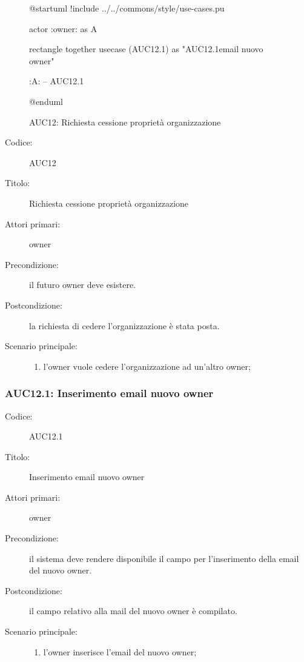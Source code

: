 \documentclass[../../../analisi-dei-requisiti.tex]{subfiles}
\begin{document}
\begin{figure}[H]
  \centering
  \begin{plantuml}
  @startuml
  !include ../../commons/style/use-cases.pu

  actor :owner: as A

  rectangle {
    together {
      usecase (AUC12.1) as "AUC12.1\nInserimento email nuovo owner"
    }
  }

  :A: -- AUC12.1

  @enduml
  \end{plantuml}
  \caption{AUC12: Richiesta cessione proprietà organizzazione}
  \label{fig:auc12}
\end{figure}

\begin{description}
  \item[Codice:] AUC12
  \item[Titolo:] Richiesta cessione proprietà organizzazione
  \item[Attori primari:] owner
  \item[Precondizione:] il futuro owner deve esistere.
  \item[Postcondizione:] la richiesta di cedere l'organizzazione è stata posta.
  \item[Scenario principale:]
  \begin{enumerate}
    \item l'owner vuole cedere l'organizzazione ad un'altro owner;
  \end{enumerate}
\end{description}

\subsubsection{AUC12.1: Inserimento email nuovo owner}%
\label{subs:AUC12.1}
\begin{description}
  \item[Codice:] AUC12.1
  \item[Titolo:] Inserimento email nuovo owner
  \item[Attori primari:] owner
  \item[Precondizione:] il sistema deve rendere disponibile il campo per l'inserimento della email del nuovo owner.
  \item[Postcondizione:] il campo relativo alla mail del nuovo owner è compilato.
  \item[Scenario principale:]
  \begin{enumerate}
    \item l'owner inserisce l'email del nuovo owner;
  \end{enumerate}
\end{description}
\end{document}
